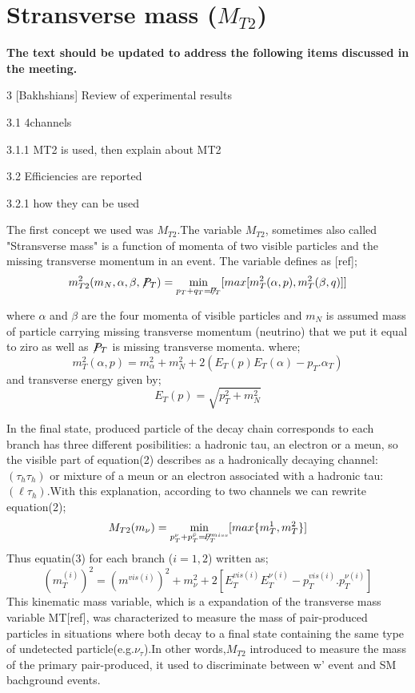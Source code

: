 \section{Stransverse mass ($M_{T2}$)}


{\bf The text should be updated to address the following items discussed in the meeting.}


3 [Bakhshians] Review of experimental results

3.1 4channels

3.1.1 MT2 is used, then explain about MT2

3.2 Efficiencies are reported

3.2.1 how they can be used





The first concept we used was $M_{T2}$.The variable $M_{T2}$, sometimes also called "Stransverse mass" is a function of momenta of two visible particles and the missing transverse momentum  in an event. The variable defines as [ref];
\begin{equation}
m^2_{T2}(m_{N},\alpha,\beta,\not\!P_{T}) = \displaystyle\min_{p_T+q_T=\not\!P_T} [max[m^2_{T}(\alpha,p),m^2_{T}(\beta,q)]]
\end{equation}

 
where $\alpha$ and $\beta$ are the four momenta of visible particles and  $m_N$ is assumed mass of particle carrying missing transverse momentum (neutrino) that we put it equal to ziro as well as $\not\!P_T$ is missing transverse momenta. where;
\begin{equation}
m^2_{T}(\alpha,p) =  m^2_{\alpha}+m^2_N+2(E_T(p)E_T(\alpha)-p_T.\alpha_T)
\end{equation}
and transverse energy given by; 
\begin{equation}
E_T(p)=\sqrt{p^2_T+m^2_N}
\end{equation}

In the final state, produced particle of the decay chain corresponds to each branch has three different posibilities: a hadronic tau, an electron or a meun, so the visible part of equation(2) describes as a hadronically decaying channel:$(\tau_{h}  \tau_{h})$ or mixture of a meun or an electron associated with a hadronic tau:$(\ell \tau_{h})$.With this explanation, according to two channels we can rewrite equation(2);
\begin{equation}
M_{T2}(m_{\nu})=  \displaystyle\min_{p^{\nu}_T+p^{\bar{\nu}}_T=\not\!P^{miss}_T} [max \{m^1_{T},m^2_{T}\}]
\end{equation}
Thus equatin(3) for each branch ($i=1,2$) written as;
\begin{equation}
(m^{(i)}_T)^2 = (m^{vis(i)})^2+m^2_{\nu}+2[{E^{vis(i)}_T}{E^{\nu(i)}_{T}}-{p^{vis(i)}_T}.{p^{\nu(i)}_T}]
\end{equation} 
 This kinematic mass variable, which is a expandation of the transverse mass variable MT[ref], was characterized to measure the mass of pair-produced particles in situations where both decay to a final state containing the same type of undetected particle(e.g.$\nu_{\tau}$).In other words,$M_{T2}$ introduced to measure the mass of the primary pair-produced, it used to discriminate between w' event and SM bachground events.
 
